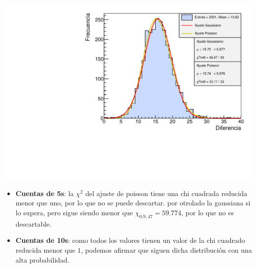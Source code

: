 \documentclass[11pt]{article}
\begin{document}
\begin{minipage}[t]{0.5\linewidth}
\begin{center} 
	\label{Fig:2s}
	\includegraphics[width=1\linewidth]{../Graficas/Histo_2s.pdf}
\end{center}
\end{minipage}	

\begin{itemize}
	\item \textbf{Cuentas de 5s}: la $\chi^2$ del ajuste de poisson tiene una chi cuadrada reducida menor que uno, por lo que no se puede descartar. por otrolado la gaussiana si lo supera, pero sigue siendo menor que $\chi_{0.9,47}=59.774$, por lo que no es descartable. 
	\item \textbf{Cuentas de 10s}: como todos los valores tienen un valor de la chi cuadrado reducida menor que $1$, podemos afirmar que siguen dicha distribución con una alta probabilidad.
\end{itemize}
\end{document}
